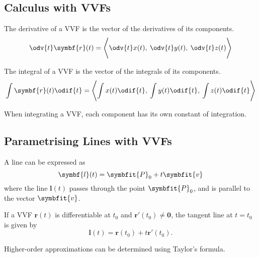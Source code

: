 \documentclass{article}
\begin{document}
\subsection{Calculus with VVFs}
\begin{theorem}
    The derivative of a VVF is the vector of the derivatives of its components.
    \begin{equation*}
        \odv{t}\symbf{r}(t) = \avec[\Bigg]{\odv{t}x(t),\: \odv{t}y(t),\: \odv{t}z(t)}
    \end{equation*}
\end{theorem}
\begin{theorem}
    The integral of a VVF is the vector of the integrals of its components.
    \begin{equation*}
        \int\symbf{r}(t)\odif{t}
        = \avec[\Bigg]{\int x(t) \odif{t},\: \int y(t) \odif{t},\: \int z(t) \odif{t}}
    \end{equation*}
\end{theorem}
\begin{remark}
    When integrating a VVF, each component has its own constant of integration.
\end{remark}
\subsection{Parametrising Lines with VVFs}
\begin{definition}
    A line can be expressed as
    \begin{equation*}
        \symbf{l}(t) = \symbfit{P}_0 + t\symbfit{v}
    \end{equation*}
    where the line \(\symbf{l}(t)\) passes through the point \(\symbfit{P}_0\), and is parallel to the vector \(\symbfit{v}\).
\end{definition}
\begin{definition}
    If a VVF \(\symbf{r}(t)\) is differentiable at
    \(t_0\) and \(\symbf{r'}(t_0)\ne\symbf{0}\), the tangent line at
    \(t=t_0\) is given by
    \begin{equation*}
        \symbf{l}(t) = \symbf{r}(t_0)+t\symbf{r'}(t_0).
    \end{equation*}
\end{definition}
\begin{remark}
    Higher-order approximations can be determined using Taylor's formula.
\end{remark}
\end{document}
